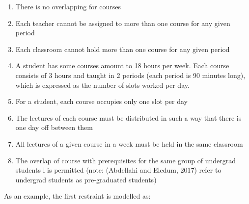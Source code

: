 \documentclass[a4paper, 12pt]{report}
\begin{document}
\begin{enumerate}
	\item There is no overlapping for courses
	\item Each teacher cannot be assigned to more than one course for any given
	period
	\item Each classroom cannot hold more than one course for any given period
	\item A student has some courses amount to 18 hours per week. Each course
	consists of 3 hours and taught in 2 periods (each period is 90 minutes
	long), which is expressed as the number of slots worked per day.
	\item For a student, each course occupies only one slot per day
	\item The lectures of each course must be distributed in such a way that
	there is one day off between them
	\item All lectures of a given course in a week must be held in the same
	classroom
	\item The overlap of course with prerequisites for the same group of
	undergrad students l is permitted (note: (Abdellahi and Eledum, 2017) refer
	to undergrad students as pre-graduated students)
\end{enumerate}

As an example, the first restraint is modelled as:

%

%
\end{document}
